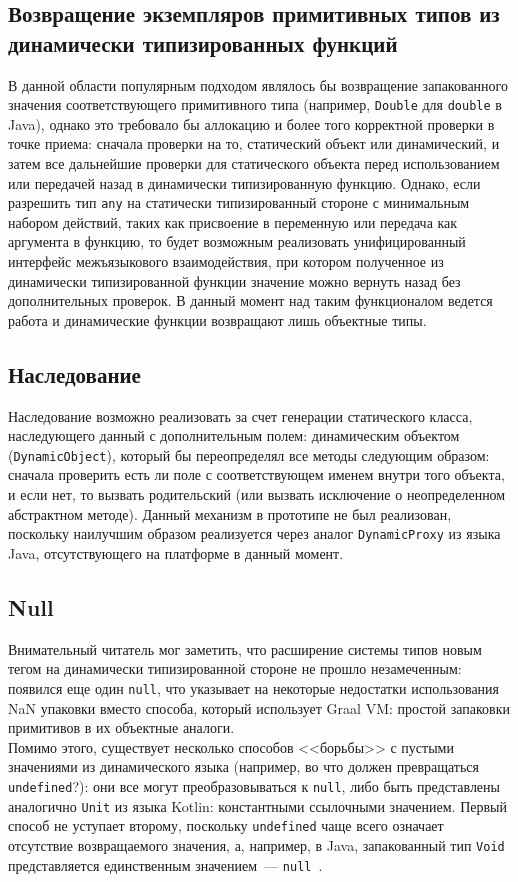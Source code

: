 \documentclass[times
]{itmo-student-thesis}
\begin{document}
\subsection{Возвращение экземпляров примитивных типов из динамически типизированных функций}
В данной области популярным подходом являлось бы возвращение запакованного значения соответствующего примитивного типа (например, \texttt{Double} для \texttt{double} в Java), однако это требовало бы аллокацию и более того корректной проверки в точке приема: сначала проверки на то, статический объект или динамический, и затем все дальнейшие проверки для статического объекта перед использованием или передачей назад в динамически типизированную функцию. Однако, если разрешить тип \texttt{any} на статически типизированный стороне с минимальным набором действий, таких как присвоение в переменную или передача как аргумента в функцию, то будет возможным реализовать унифицированный интерфейс межъязыкового взаимодействия, при котором полученное из динамически типизированной функции значение можно вернуть назад без дополнительных проверок. В данный момент над таким функционалом ведется работа и динамические функции возвращают лишь объектные типы.

\subsection{Наследование}
Наследование возможно реализовать за счет генерации статического класса, наследующего данный с дополнительным полем: динамическим объектом (\texttt{DynamicObject}), который бы переопределял все методы следующим образом: сначала проверить есть ли поле с соответствующем именем внутри того объекта, и если нет, то вызвать родительский (или вызвать исключение о неопределенном абстрактном методе). Данный механизм в прототипе не был реализован, поскольку наилучшим образом реализуется через аналог \texttt{DynamicProxy} из языка Java, отсутствующего на платформе в данный момент.
\subsection{Null}
Внимательный читатель мог заметить, что расширение системы типов новым тегом на динамически типизированной стороне не прошло незамеченным: появился еще один \texttt{null}, что указывает на некоторые недостатки использования NaN упаковки вместо способа, который использует Graal VM: простой запаковки примитивов в их объектные аналоги.\\
Помимо этого, существует несколько способов <<борьбы>> с пустыми значениями из динамического языка (например, во что должен превращаться \texttt{undefined}?): они все могут преобразовываться к \texttt{null}, либо быть представлены аналогично \texttt{Unit} из языка Kotlin: константными ссылочными значением. Первый способ не уступает второму, поскольку \texttt{undefined} чаще всего означает отсутствие возвращаемого значения, а, например, в Java, запакованный тип \texttt{Void} представляется единственным значением~--- \texttt{null}~\cite{java-lang-void}.
\end{document}

